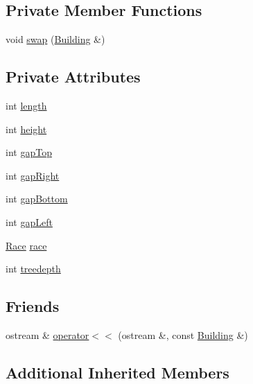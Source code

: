 \subsection*{Private Member Functions}
\begin{DoxyCompactItemize}
\item 
void \hyperlink{classghost_1_1Building_a3bd95117c9a9b063190962f1fd972ff7}{swap} (\hyperlink{classghost_1_1Building}{Building} \&)
\end{DoxyCompactItemize}
\subsection*{Private Attributes}
\begin{DoxyCompactItemize}
\item 
int \hyperlink{classghost_1_1Building_a19d6a2258d7d455607dd056f5ed7d390}{length}
\item 
int \hyperlink{classghost_1_1Building_a2245674ef580e60ef2b3e908df930e41}{height}
\item 
int \hyperlink{classghost_1_1Building_a6b95d50f1677590d310759c828c8bf48}{gap\-Top}
\item 
int \hyperlink{classghost_1_1Building_a4c6f038b8f927d47d1cbfeb4c21fa29c}{gap\-Right}
\item 
int \hyperlink{classghost_1_1Building_a720db34cd6c7a1c6af1ff376192ae017}{gap\-Bottom}
\item 
int \hyperlink{classghost_1_1Building_a2a4c6779842047d5ec30c4a0b600c27e}{gap\-Left}
\item 
\hyperlink{namespaceghost_a8b1db75c40c6980adcf244ddccc0324b}{Race} \hyperlink{classghost_1_1Building_a8192def1fb4bdf85ee44cd99dd04f598}{race}
\item 
int \hyperlink{classghost_1_1Building_a9cce7581682e78208edde8ed462afe14}{treedepth}
\end{DoxyCompactItemize}
\subsection*{Friends}
\begin{DoxyCompactItemize}
\item 
ostream \& \hyperlink{classghost_1_1Building_a2a301d5694a033118e4812c26ae7707c}{operator$<$$<$} (ostream \&, const \hyperlink{classghost_1_1Building}{Building} \&)
\end{DoxyCompactItemize}
\subsection*{Additional Inherited Members}


